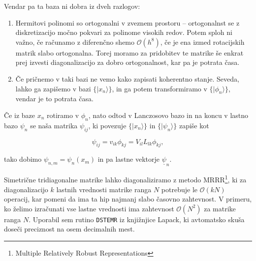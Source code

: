 \documentclass[a4 paper, 12pt]{article}
\begin{document}
Vendar pa ta baza ni dobra iz dveh razlogov:
\begin{enumerate}
	\item{Hermitovi polinomi so ortogonalni v zveznem prostoru -- ortogonalnst se z diskretizacijo močno pokvari za polinome
		visokih redov. Potem sploh ni važno, če računamo z diferenčno shemo $\mathcal{O}(h^8)$, če je ena izmed rotacijskih
		matrik slabo ortogonalna. Torej moramo za pridobitev te matrike še enkrat prej izvesti diagonalizacijo za dobro
		ortogonalnost, kar pa je potrata časa.}
	\item{Če pričnemo v taki bazi ne vemo kako zapisati koherentno stanje. Seveda, lahko ga zapišemo v bazi $\big\{|x_n\rangle\big\}$,
		in ga potem transformiramo v $\big\{|\phi_n\rangle\big\}$, vendar je to potrata časa.}
\end{enumerate}

Če iz baze $x_n$ rotiramo v $\phi_n$, nato odtod v Lanczosovo bazo in na koncu v lastno bazo $\psi_n$ se naša matrika $\psi_{ij}$, ki
povezuje $\big\{|x_n\rangle\big\}$ in $\big\{|\psi_n\rangle\big\}$ zapiše kot

\[
	\psi_{ij} = v_{ik} \phi_{kj} = V_{il} L_{lk} \phi_{kj},
\]

tako dobimo $\psi_{n,m} = \psi_n (x_m)$ in pa lastne vektorje $\underline{\psi}_n$.

Simetrične tridiagonalne matrike lahko diagonaliziramo z metodo MRRR\footnote{Multiple Relatively Robust Representations}, ki za
diagonalizacijo $k$ lastnih vrednosti matrike ranga $N$ potrebuje le $\mathcal{O} (kN)$ operacij, kar pomeni da ima ta hip
najmanj slabo časovno zahtevnost. V primeru, ko želimo izračunati vse lastne vrednosti ima zahtevnost $\mathcal{O}(N^2)$ za
matrike ranga $N$. Uporabil sem rutino {\tt DSTEMR} iz knjižnjice {\sc Lapack}, ki avtomatsko skuša doseči preciznost na
osem decimalnih mest.
\end{document}
